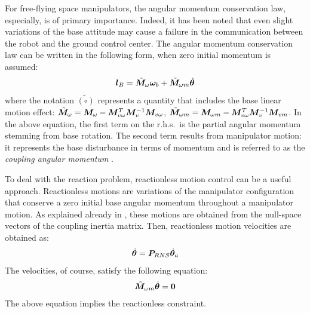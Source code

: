For free-flying space manipulators,
the angular momentum conservation law, especially,
is of primary importance.
Indeed, it has been noted that even slight variations of the base attitude may cause a failure
in the communication between the robot and the ground control center.
The angular momentum conservation law can be written in the following form, when zero initial momentum 
is assumed:
% 
\begin{align}
  \bm{l}_{B} = {\tilde{\bm{M}}}_{\omega}\bm{\omega}_{b} + {\tilde{\bm{M}}}_{\omega m}{\dot{\bm{\theta}}}
\end{align} 
%
where the notation $\tilde{(\circ)}$ represents a quantity that includes the base linear motion effect:
${\tilde{\bm{M}}}_{\omega} = \bm{M}_{\omega} - \bm{M}_{v\omega}^{T}\bm{M}_{v}^{-1}\bm{M}_{v\omega}$,
${\tilde{\bm{M}}}_{\omega m} = \bm{M}_{\omega m} - \bm{M}_{v\omega}^{T}\bm{M}_{v}^{-1}\bm{M}_{vm}$.
In the above equation,
the first term on the r.h.s.\ is the partial angular momentum stemming from base rotation.
The second term results from manipulator motion:
it represents the base disturbance in terms of momentum and is referred to as the 
\textit{coupling angular momentum} \cite{Nenchev1999a}.

To deal with the reaction problem,
reactionless motion control can be a useful approach.
Reactionless motions are variations of the manipulator configuration
that conserve a zero initial base angular momentum throughout a manipulator motion.
As explained already in ,
these motions are obtained from the null-space vectors of the coupling inertia matrix.
Then, reactionless motion velocities are obtained as:
%
\begin{align}
  {\dot{\bm{\theta}}} = \bm{P}_{RNS}{\dot{\bm{\theta}}}_{a}\label{eq:RNS_VELO}
\end{align}
%
The velocities, of course, satisfy the following equation:
%
\begin{align}
  {\tilde{\bm{M}}}_{\omega m}{\dot{\bm{\theta}}} = \bm{0}\label{eq:RNS_CONST}
\end{align}
%
The above equation implies the reactionless constraint.

